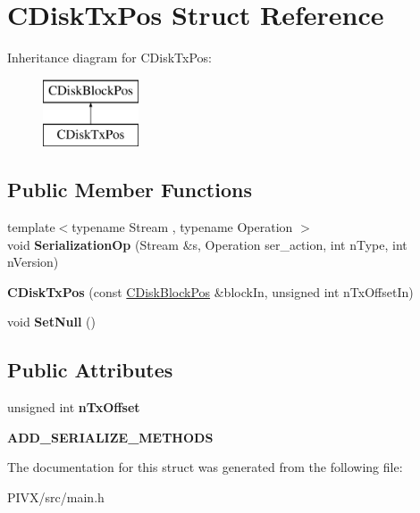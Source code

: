 \hypertarget{struct_c_disk_tx_pos}{}\section{C\+Disk\+Tx\+Pos Struct Reference}
\label{struct_c_disk_tx_pos}
Inheritance diagram for C\+Disk\+Tx\+Pos\+:\begin{figure}[H]
\begin{center}
\leavevmode
\includegraphics[height=2.000000cm]{struct_c_disk_tx_pos}
\end{center}
\end{figure}
\subsection*{Public Member Functions}
\begin{DoxyCompactItemize}
\item 
\mbox{\label{struct_c_disk_tx_pos_a1a68f1de894f0791a7ad64e3e6ea6fd6}} 
{\footnotesize template$<$typename Stream , typename Operation $>$ }\\void {\bfseries Serialization\+Op} (Stream \&s, Operation ser\+\_\+action, int n\+Type, int n\+Version)
\item 
\mbox{\label{struct_c_disk_tx_pos_ab823a4c83ec90c8223544051f11e65fd}} 
{\bfseries C\+Disk\+Tx\+Pos} (const \mbox{\hyperlink{struct_c_disk_block_pos}{C\+Disk\+Block\+Pos}} \&block\+In, unsigned int n\+Tx\+Offset\+In)
\item 
\mbox{\label{struct_c_disk_tx_pos_a22eb47d077f9c355373772eb42853fcf}} 
void {\bfseries Set\+Null} ()
\end{DoxyCompactItemize}
\subsection*{Public Attributes}
\begin{DoxyCompactItemize}
\item 
\mbox{\label{struct_c_disk_tx_pos_af19fa085a69ba3bac7b52413a37adf23}} 
unsigned int {\bfseries n\+Tx\+Offset}
\item 
\mbox{\label{struct_c_disk_tx_pos_a2990c083fbbd0fb5f5aa4115e540cd21}} 
{\bfseries A\+D\+D\+\_\+\+S\+E\+R\+I\+A\+L\+I\+Z\+E\+\_\+\+M\+E\+T\+H\+O\+DS}
\end{DoxyCompactItemize}


The documentation for this struct was generated from the following file\+:\begin{DoxyCompactItemize}
\item 
P\+I\+V\+X/src/main.\+h\end{DoxyCompactItemize}
